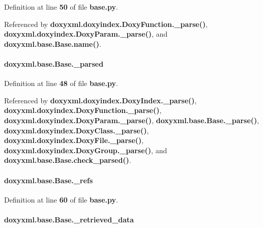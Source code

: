 Definition at line {\bf 50} of file {\bf base.\+py}.



Referenced by {\bf doxyxml.\+doxyindex.\+Doxy\+Function.\+\_\+parse()}, {\bf doxyxml.\+doxyindex.\+Doxy\+Param.\+\_\+parse()}, and {\bf doxyxml.\+base.\+Base.\+name()}.

\paragraph[{\+\_\+parsed}]{\setlength{\rightskip}{0pt plus 5cm}doxyxml.\+base.\+Base.\+\_\+parsed\hspace{0.3cm}{\ttfamily [private]}}\label{classdoxyxml_1_1base_1_1Base_aa1aa113d73d9935bda01ef91fca8498f}


Definition at line {\bf 48} of file {\bf base.\+py}.



Referenced by {\bf doxyxml.\+doxyindex.\+Doxy\+Index.\+\_\+parse()}, {\bf doxyxml.\+doxyindex.\+Doxy\+Function.\+\_\+parse()}, {\bf doxyxml.\+doxyindex.\+Doxy\+Param.\+\_\+parse()}, {\bf doxyxml.\+base.\+Base.\+\_\+parse()}, {\bf doxyxml.\+doxyindex.\+Doxy\+Class.\+\_\+parse()}, {\bf doxyxml.\+doxyindex.\+Doxy\+File.\+\_\+parse()}, {\bf doxyxml.\+doxyindex.\+Doxy\+Group.\+\_\+parse()}, and {\bf doxyxml.\+base.\+Base.\+check\+\_\+parsed()}.

\paragraph[{\+\_\+refs}]{\setlength{\rightskip}{0pt plus 5cm}doxyxml.\+base.\+Base.\+\_\+refs\hspace{0.3cm}{\ttfamily [private]}}\label{classdoxyxml_1_1base_1_1Base_a428c6fbe169c3b7b6d69ae8d6b88cfe1}


Definition at line {\bf 60} of file {\bf base.\+py}.

\paragraph[{\+\_\+retrieved\+\_\+data}]{\setlength{\rightskip}{0pt plus 5cm}doxyxml.\+base.\+Base.\+\_\+retrieved\+\_\+data\hspace{0.3cm}{\ttfamily [private]}}\label{classdoxyxml_1_1base_1_1Base_a77f8b1ff11e512c0f0def3d0901bed22}


